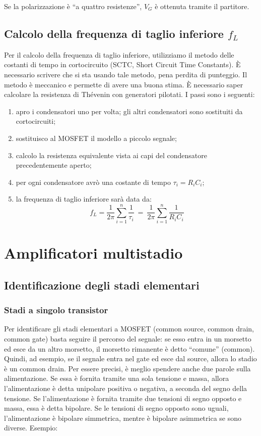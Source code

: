 \documentclass[a4paper,twocolumn,notitlepage]{book}
\begin{document}
	Se la polarizzazione è ``a quattro resistenze'', $V_G$ è ottenuta tramite il partitore.
	
	\subsection*{Calcolo della frequenza di taglio inferiore $f_L$}
	Per il calcolo della frequenza di taglio inferiore, utilizziamo il metodo delle costanti di tempo in cortocircuito (SCTC, Short Circuit Time Constants). È necessario scrivere che si sta usando tale metodo, pena perdita di punteggio.\newline
	Il metodo è meccanico e permette di avere una buona stima. È necessario saper calcolare la resistenza di Thévenin con generatori pilotati. I passi sono i seguenti:
	\begin{enumerate}
		\item apro i condensatori uno per volta; gli altri condensatori sono sostituiti da cortocircuiti;
		\item sostituisco al MOSFET il modello a piccolo segnale;
		\item calcolo la resistenza equivalente vista ai capi del condensatore precedentemente aperto;
		\item per ogni condensatore avrò una costante di tempo $\tau_i=R_i C_i$;
		\item la frequenza di taglio inferiore sarà data da:
			\begin{equation}
				f_L=\frac{1}{2 \pi} \sum_{i=1}^n \frac{1}{\tau_i} \:=\: \frac{1}{2 \pi} \sum_{i=1}^n \frac{1}{R_i C_i}
			\end{equation}
	\end{enumerate}
	
	\section*{Amplificatori multistadio}
	\subsection*{Identificazione degli stadi elementari}
		\subsubsection*{Stadi a singolo transistor}	
		Per identificare gli stadi elementari a MOSFET (common source, common drain, common gate) basta seguire il percorso del segnale: se esso entra in un morsetto ed esce da un altro morsetto, il morsetto rimanente è detto  ``comune''  (common).
		Quindi, ad esempio, se il segnale entra nel gate ed esce dal source, allora lo stadio è un common drain.
	Per essere precisi, è meglio spendere anche due parole sulla alimentazione. 
Se essa è fornita tramite una sola tensione e massa, allora l'alimentazione è detta unipolare positiva o negativa, a seconda del segno della tensione.  \newline
		Se l'alimentazione è fornita tramite due tensioni di segno opposto e massa, essa è detta bipolare. Se le tensioni di segno opposto sono uguali, l'alimentazione è bipolare simmetrica, mentre è bipolare asimmetrica se sono diverse.
		\newline
		Esempio: \medskip
		
\end{document}
